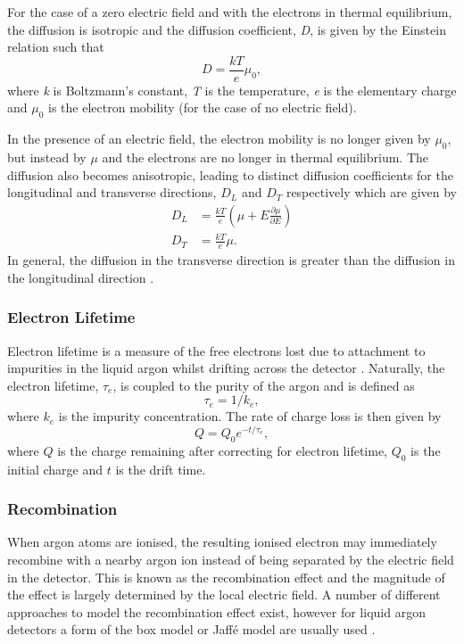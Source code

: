 For the case of a zero electric field and with the electrons in thermal equilibrium, the diffusion is isotropic and the diffusion coefficient, \textit{D}, is given by the Einstein relation such that
\begin{equation}
    D = \frac{kT}{e}\mu_0,
\end{equation}
where \textit{k} is Boltzmann's constant, \textit{T} is the temperature, \textit{e} is the elementary charge and $\mu_0$ is the electron mobility (for the case of no electric field).

In the presence of an electric field, the electron mobility is no longer given by $\mu_0$, but instead by $\mu$ and the electrons are no longer in thermal equilibrium. The diffusion also becomes anisotropic, leading to distinct diffusion coefficients for the longitudinal and transverse directions, $D_L$ and $D_T$ respectively which are given by
\begin{equation}
\begin{split}
    D_L &= \frac{kT}{e}(\mu + E \frac{\partial \mu}{\partial E}) \\
    D_T &= \frac{kT}{e}\mu.
\end{split}
\end{equation}
In general, the diffusion in the transverse direction is greater than the diffusion in the longitudinal direction \cite{LArTPC_book} \cite{diffusion}.

\subsubsection{Electron Lifetime}
 Electron lifetime is a measure of the free electrons lost due to attachment to impurities in the liquid argon whilst drifting across the detector \cite{ArgoNeuT_electron_lifetime_paper}. Naturally, the electron lifetime, $\tau_{e}$, is coupled to the purity of the argon and is defined as 
 \begin{equation}
     \tau_{e} = 1/k_e,
 \end{equation}
 where $k_e$ is the impurity concentration. The rate of charge loss is then given by 
 \begin{equation}
     Q = Q_{0}e^{-t/\tau_e},
 \end{equation}
where $Q$ is the charge remaining after correcting for electron lifetime, $Q_0$ is the initial charge and $t$ is the drift time. 
 
\subsubsection{Recombination}
When argon atoms are ionised, the resulting ionised electron may immediately recombine with a nearby argon ion instead of being separated by the electric field in the detector. This is known as the recombination effect and the magnitude of the effect is largely determined by the local electric field. A number of different approaches to model the recombination effect exist, however for liquid argon detectors a form of the box model or Jaff\'{e} model are usually used \cite{LArTPC_book}.

